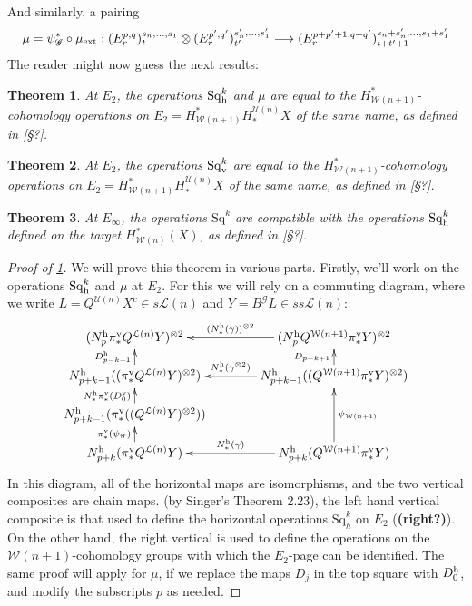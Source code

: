 \documentclass[11pt]{amsart}
\theoremstyle{plain}
\newtheorem{thm}{Theorem}[section]
\theoremstyle{definition}
\renewcommand{\to}{\longrightarrow}
\newcommand{\scrG}{\mathscr{G}}
\newcommand{\calW}{\mathcal{W}}
\newcommand{\calU}{\mathcal{U}}
\newcommand{\calL}{\mathcal{L}}
\theoremstyle{plain}
\newcommand{\BSW}{{\scrG}}
\newcommand{\BSWres}{B^\BSW}%
\newcommand{\ExtCohProd}{\mu_\textup{ext}}
\newcommand{\Sq}{\mathrm{Sq}}
\begin{document}
\begin{Composite functor spectral sequences}
And similarly, a pairing
\[\mu=\psi_{\BSW}^*\circ\ExtCohProd:(E^{p,q}_r)^{s_n,\ldots,s_1}_t\otimes (E^{p',q'}_r)^{s'_n,\ldots,s'_1}_{t'}\to (E^{p+p'+1,q+q'}_r)^{s_n+s'_n,\ldots,s_1+s'_1}_{t+t'+1}\]
The reader might now guess the next results:
\begin{thm}\label{E2CompFuncLieOperationsID}
At $E_2$, the operations $\Sq_\textup{h}^k$ and $\mu$ are equal to the $H^*_{\calW(n+1)}$-cohomology operations on $E_2=H^*_{\calW(n+1)}H_*^{\calU(n)}X$ of the same name, as defined in [\S?].
\end{thm}
\begin{thm}\label{E2CompFuncKosOperationsID}
At $E_2$, the operations $\Sq_\textup{v}^k$ are equal to the $H^*_{\calW(n+1)}$-cohomology operations on $E_2=H^*_{\calW(n+1)}H_*^{\calU(n)}X$ of the same name, as defined in [\S?].
\end{thm}
\begin{thm}\label{EInftyCompFuncOperationsID}
At $E_\infty$, the operations $\Sq^k$ are compatible with the operations $\Sq^k_\textup{h}$ defined on the target $H^*_{\calW(n)}(X)$, as defined in [\S?].
\end{thm} 
\begin{tricky proofs of operation compatibilities}
\begin{proof}[Proof of \ref{E2CompFuncLieOperationsID}]
We will prove this theorem in various parts. Firstly, we'll work on the operations $\Sq_\textup{h}^k$ and $\mu$ at $E_2$.
For this we will rely on a commuting diagram, where we write $L=Q^{\calU(n)}X^c\in s\calL(n)$ and $Y=\BSWres L\in ss\calL(n)$:
\[\xymatrix@C=13mm@R=4mm{
(N_p^\textup{h}\pi_*^{\textup{v}}Q^{\calL(n)}Y)^{\otimes2}&%
(N_p^\textup{h}Q^{\calW(n+1)}\pi_*^{\textup{v}}Y)^{\otimes2}
\ar[l]_-{(N^\textup{h}_*(\gamma))^{\otimes 2}}
\\%
N_{p+k-1}^\textup{h}((\pi_*^{\textup{v}}Q^{\calL(n)}Y)^{\otimes2})
\ar[u]^-{D_{p-k+1}^\textup{h}}
&%
N_{p+k-1}^\textup{h}((Q^{\calW(n+1)}\pi_*^{\textup{v}}Y)^{\otimes2})
\ar[u]^-{D_{p-k+1}}
\ar[l]_-{N^\textup{h}_*(\gamma^{\otimes 2})}
\\%
N_{p+k-1}^\textup{h}(\pi_*^{\textup{v}}((Q^{\calL(n)}Y)^{\otimes2}))
\ar[u]^-{N^\textup{h}_*\pi_*^\textup{v}(D_0^\textup{v})}
&%
\\%
N^\textup{h}_{p+k}(\pi_*^{\textup{v}} Q^{\calL(n)}Y)
\ar[u]^-{\pi_*^\textup{v}(\psi_{\BSW})}
&%
N^\textup{h}_{p+k}(Q^{\calW(n+1)}\pi_*^{\textup{v}} Y)
\ar[uu]_-{\psi_{\calW(n+1)}}
\ar[l]_-{N^\textup{h}_*(\gamma)}
}\]
In this diagram, all of the horizontal maps are isomorphisms, and the two vertical composites are chain maps. (by Singer's Theorem 2.23),  the left hand vertical composite is that used to define the horizontal operations $\Sq^{k}_h$ on $E_2$ (\textbf{(right?)}). On the other hand, the right vertical is used to define the operations on the $\calW(n+1)$-cohomology groups with which the $E_2$-page can be identified. The same proof will apply for $\mu$, if we replace the maps $D_j$ in the top square with $D_0^\textup{h}$, and modify the subscripts $p$ as needed.


\end{proof}
\end{tricky proofs of operation compatibilities}
\end{Composite functor spectral sequences}
\end{document}
